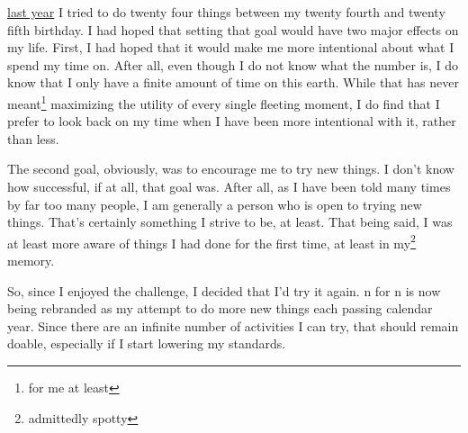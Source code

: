 \documentclass[12pt]{article}[titlepage]
\newcommand{\1}{\={a}}
\newcommand{\2}{\={e}}
\newcommand{\3}{\={\i}}
\newcommand{\4}{\=o}
\newcommand{\5}{\=u}
\newcommand{\6}{\={A}}
\renewcommand{\,}{\textsuperscript{,}}
\begin{document}
\href{twenty-four.html}{last year} I tried to do twenty four things between my twenty fourth and twenty fifth birthday. I had hoped that setting that goal would have two major effects on my life. First, I had hoped that it would make me more intentional about what I spend my time on. After all, even though I do not know what the number is, I do know that I only have a finite amount of time on this earth. While that has never meant\footnote{for me at least} maximizing the utility of every single fleeting moment, I do find that I prefer to look back on my time when I have been more intentional with it, rather than less.
 
The second goal, obviously, was to encourage me to try new things. I don't know how successful, if at all, that goal was. After all, as I have been told many times by far too many people, I am generally a person who is open to trying new things. That's certainly something I strive to be, at least. That being said, I was at least more aware of things I had done for the first time, at least in my\footnote{admittedly spotty} memory.
 
So, since I enjoyed the challenge, I decided that I'd try it again. n for n is now being rebranded as my attempt to do more new things each passing calendar year. Since there are an infinite number of activities I can try, that should remain doable, especially if I start lowering my standards.
 
\end{document}
